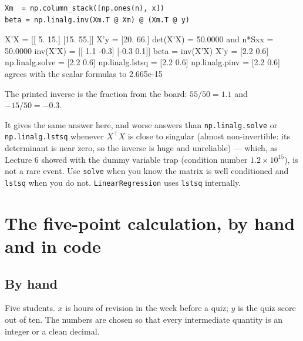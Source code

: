 \documentclass[11pt]{article}
\begin{document}
\begin{lstlisting}
Xm  = np.column_stack([np.ones(n), x])
beta = np.linalg.inv(Xm.T @ Xm) @ (Xm.T @ y)
\end{lstlisting}
\begin{codeout}
X'X =
 [[ 5. 15.]
 [15. 55.]]
X'y = [20. 66.]
det(X'X) = 50.0000   and n*Sxx = 50.0000
inv(X'X) =
 [[ 1.1 -0.3]
 [-0.3  0.1]]
beta = inv(X'X) X'y  = [2.2 0.6]
np.linalg.solve      = [2.2 0.6]
np.linalg.lstsq      = [2.2 0.6]
np.linalg.pinv       = [2.2 0.6]
agrees with the scalar formulas to 2.665e-15
\end{codeout}

The printed inverse is the fraction from the board: $55/50 = 1.1$ and
$-15/50 = -0.3$.

\begin{caution}
It gives the same answer here, and worse answers than
\texttt{np.linalg.solve} or \texttt{np.linalg.lstsq} whenever
$X^{\!\top}\!X$ is close to singular (almost non-invertible: its
determinant is near zero, so the inverse is huge and unreliable) --- which, as
Lecture 6 showed with the
dummy variable trap (condition number $1.2\times10^{15}$), is not a rare
event. Use \texttt{solve} when you know the matrix is well conditioned and
\texttt{lstsq} when you do not. \texttt{LinearRegression} uses
\texttt{lstsq} internally.
\end{caution}

\section{The five-point calculation, by hand and in code}
\label{sec:hand}

\subsection{By hand}

Five students. $x$ is hours of revision in the week before a quiz; $y$ is the
quiz score out of ten. The numbers are chosen so that every intermediate
quantity is an integer or a clean decimal.
\end{document}
